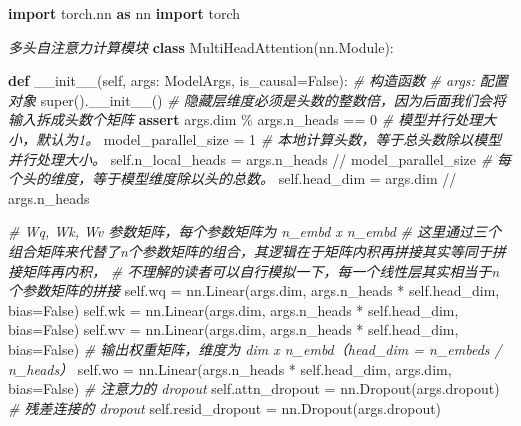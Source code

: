 \documentclass[
]{article}
\newenvironment{Shaded}{}{}
\newcommand{\BuiltInTok}[1]{\textcolor[rgb]{0.00,0.50,0.00}{#1}}
\newcommand{\CommentTok}[1]{\textcolor[rgb]{0.38,0.63,0.69}{\textit{#1}}}
\newcommand{\ControlFlowTok}[1]{\textcolor[rgb]{0.00,0.44,0.13}{\textbf{#1}}}
\newcommand{\DecValTok}[1]{\textcolor[rgb]{0.25,0.63,0.44}{#1}}
\newcommand{\FunctionTok}[1]{\textcolor[rgb]{0.02,0.16,0.49}{#1}}
\newcommand{\ImportTok}[1]{\textcolor[rgb]{0.00,0.50,0.00}{\textbf{#1}}}
\newcommand{\KeywordTok}[1]{\textcolor[rgb]{0.00,0.44,0.13}{\textbf{#1}}}
\newcommand{\NormalTok}[1]{#1}
\newcommand{\OperatorTok}[1]{\textcolor[rgb]{0.40,0.40,0.40}{#1}}
\newcommand{\VariableTok}[1]{\textcolor[rgb]{0.10,0.09,0.49}{#1}}
\begin{document}
\begin{Shaded}
\begin{Highlighting}[]
\ImportTok{import}\NormalTok{ torch.nn }\ImportTok{as}\NormalTok{ nn}
\ImportTok{import}\NormalTok{ torch}

\CommentTok{\textquotesingle{}\textquotesingle{}\textquotesingle{}多头自注意力计算模块\textquotesingle{}\textquotesingle{}\textquotesingle{}}
\KeywordTok{class}\NormalTok{ MultiHeadAttention(nn.Module):}

    \KeywordTok{def} \FunctionTok{\_\_init\_\_}\NormalTok{(}\VariableTok{self}\NormalTok{, args: ModelArgs, is\_causal}\OperatorTok{=}\VariableTok{False}\NormalTok{):}
        \CommentTok{\# 构造函数}
        \CommentTok{\# args: 配置对象}
        \BuiltInTok{super}\NormalTok{().}\FunctionTok{\_\_init\_\_}\NormalTok{()}
        \CommentTok{\# 隐藏层维度必须是头数的整数倍，因为后面我们会将输入拆成头数个矩阵}
        \ControlFlowTok{assert}\NormalTok{ args.dim }\OperatorTok{\%}\NormalTok{ args.n\_heads }\OperatorTok{==} \DecValTok{0}
        \CommentTok{\# 模型并行处理大小，默认为1。}
\NormalTok{        model\_parallel\_size }\OperatorTok{=} \DecValTok{1}
        \CommentTok{\# 本地计算头数，等于总头数除以模型并行处理大小。}
        \VariableTok{self}\NormalTok{.n\_local\_heads }\OperatorTok{=}\NormalTok{ args.n\_heads }\OperatorTok{//}\NormalTok{ model\_parallel\_size}
        \CommentTok{\# 每个头的维度，等于模型维度除以头的总数。}
        \VariableTok{self}\NormalTok{.head\_dim }\OperatorTok{=}\NormalTok{ args.dim }\OperatorTok{//}\NormalTok{ args.n\_heads}

        \CommentTok{\# Wq, Wk, Wv 参数矩阵，每个参数矩阵为 n\_embd x n\_embd}
        \CommentTok{\# 这里通过三个组合矩阵来代替了n个参数矩阵的组合，其逻辑在于矩阵内积再拼接其实等同于拼接矩阵再内积，}
        \CommentTok{\# 不理解的读者可以自行模拟一下，每一个线性层其实相当于n个参数矩阵的拼接}
        \VariableTok{self}\NormalTok{.wq }\OperatorTok{=}\NormalTok{ nn.Linear(args.dim, args.n\_heads }\OperatorTok{*} \VariableTok{self}\NormalTok{.head\_dim, bias}\OperatorTok{=}\VariableTok{False}\NormalTok{)}
        \VariableTok{self}\NormalTok{.wk }\OperatorTok{=}\NormalTok{ nn.Linear(args.dim, args.n\_heads }\OperatorTok{*} \VariableTok{self}\NormalTok{.head\_dim, bias}\OperatorTok{=}\VariableTok{False}\NormalTok{)}
        \VariableTok{self}\NormalTok{.wv }\OperatorTok{=}\NormalTok{ nn.Linear(args.dim, args.n\_heads }\OperatorTok{*} \VariableTok{self}\NormalTok{.head\_dim, bias}\OperatorTok{=}\VariableTok{False}\NormalTok{)}
        \CommentTok{\# 输出权重矩阵，维度为 dim x n\_embd（head\_dim = n\_embeds / n\_heads）}
        \VariableTok{self}\NormalTok{.wo }\OperatorTok{=}\NormalTok{ nn.Linear(args.n\_heads }\OperatorTok{*} \VariableTok{self}\NormalTok{.head\_dim, args.dim, bias}\OperatorTok{=}\VariableTok{False}\NormalTok{)}
        \CommentTok{\# 注意力的 dropout}
        \VariableTok{self}\NormalTok{.attn\_dropout }\OperatorTok{=}\NormalTok{ nn.Dropout(args.dropout)}
        \CommentTok{\# 残差连接的 dropout}
        \VariableTok{self}\NormalTok{.resid\_dropout }\OperatorTok{=}\NormalTok{ nn.Dropout(args.dropout)}
         

\end{Highlighting}
\end{Shaded}
\end{document}
